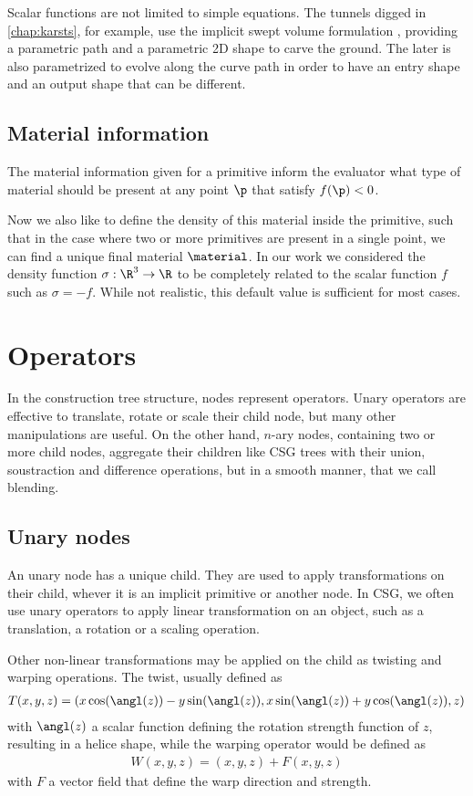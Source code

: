 Scalar functions are not limited to simple equations. The tunnels digged in \cref{chap:karsts}, for example, use the implicit swept volume formulation \cite{Schroeder1994}, providing a parametric path and a parametric 2D shape to carve the ground. The later is also parametrized to evolve along the curve path in order to have an entry shape and an output shape that can be different.

\subsection{Material information}
The material information given for a primitive inform the evaluator what type of material should be present at any point $\p$ that satisfy $f(\p) < 0$.

Now we also like to define the density of this material inside the primitive, such that in the case where two or more primitives are present in a single point, we can find a unique final material $\material$. In our work we considered the density function $\sigma: \R^3 \to \R$ to be completely related to the scalar function $f$ such as $\sigma = -f$. While not realistic, this default value is sufficient for most cases.

\section{Operators}
In the construction tree structure, nodes represent operators. Unary operators are effective to translate, rotate or scale their child node, but many other manipulations are useful. On the other hand, $n$-ary nodes, containing two or more child nodes, aggregate their children like CSG trees with their union, soustraction and difference operations, but in a smooth manner, that we call blending.

\subsection{Unary nodes}
An unary node has a unique child. They are used to apply transformations on their child, whever it is an implicit primitive or another node. In CSG, we often use unary operators to apply linear transformation on an object, such as a translation, a rotation or a scaling operation. 

Other non-linear transformations may be applied on the child as twisting and warping operations. The twist, usually defined as 
\begin{align}
    T(x, y, z) = \left( x \cos(\angl(z)) - y \sin(\angl(z)), x \sin(\angl(z)) + y \cos(\angl(z)), z \right)
\end{align}
with $\angl(z)$ a scalar function defining the rotation strength function of $z$, resulting in a helice shape, while the warping operator would be defined as 
\begin{align}
    W(x,y,z) = (x,y,z) + F(x, y, z)
\end{align}
with $F$ a vector field that define the warp direction and strength.
    

